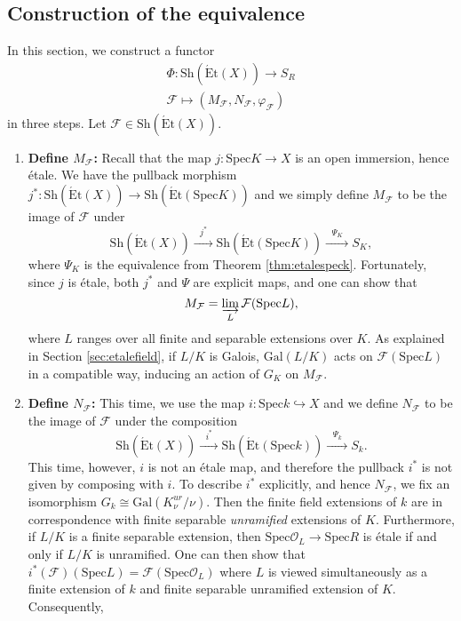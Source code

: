 \documentclass{article}
\newcommand{\Spec}{\mathrm{Spec}}
\newcommand{\Gal}{\mathrm{Gal}}
\newcommand{\Et}{\acute{\mathrm{E}}\mathrm{t}}
\newcommand{\Sh}{\mathrm{Sh}}
\theoremstyle{plain}
\theoremstyle{definition}
\begin{document}
    \subsection{Construction of the equivalence}
    In this section, we construct a functor 
    \begin{align*}
        \Phi:\Sh(\Et(X))\longrightarrow S_R\\
        \mathcal{F}\longmapsto (M_\mathcal{F},N_\mathcal{F},\varphi_\mathcal{F})
    \end{align*}
    in three steps. Let $\mathcal{F}\in\Sh(\Et(X))$.
    \begin{enumerate}[(1)]
        \item \textbf{Define $M_\mathcal{F}$:} Recall that the map $j:\Spec K\rightarrow X$ is an open immersion, hence \'{e}tale. We have the pullback morphism $j^*:\Sh(\Et(X))\to\Sh(\Et(\Spec K))$ and we simply define $M_\mathcal{F}$ to be the image of $\mathcal{F}$ under 
        $$\Sh(\Et(X))\xrightarrow{\text{  $j^*$  }}\Sh(\Et(\Spec K))\xrightarrow{\text{  $\Psi_K$  }} S_K,$$
        where $\Psi_K$ is the equivalence from Theorem \ref{thm:etalespeck}. Fortunately, since $j$ is \'{e}tale, both $j^*$ and $\Psi$ are explicit maps, and one can show that 
        $$M_\mathcal{F}=\varinjlim_{L}\mathcal{F}(\Spec L),$$
        where $L$ ranges over all finite and separable extensions over $K$. As explained in Section \ref{sec:etalefield}, if $L/K$ is Galois, $\Gal(L/K)$ acts on $\mathcal{F}(\Spec L)$ in a compatible way, inducing an action of $G_K$ on $M_\mathcal{F}$.
        \item \textbf{Define $N_\mathcal{F}$:} This time, we use the map $i:\Spec k\hookrightarrow X$ and we define $N_\mathcal{F}$ to be the image of $\mathcal{F}$ under the composition
        $$\Sh(\Et(X))\xrightarrow{\text{  $i^*$  }}\Sh(\Et(\Spec k))\xrightarrow{\text{  $\Psi_k$  }} S_k.$$
        This time, however, $i$ is not an \'{e}tale map, and therefore the pullback $i^*$ is not given by composing with $i$. To describe $i^*$ explicitly, and hence $N_\mathcal{F}$, we fix an isomorphism $G_k\cong\Gal(K^{ur}_\nu/\nu)$. Then the finite field extensions of $k$ are in correspondence with finite separable \textit{unramified} extensions of $K$. Furthermore, if $L/K$ is a finite separable extension, then $\Spec\mathcal{O}_L\to\Spec R$ is \'{e}tale if and only if $L/K$ is unramified. One can then show that $i^*(\mathcal{F})(\Spec L)=\mathcal{F}(\Spec\mathcal{O}_L)$ where $L$ is viewed simultaneously as a finite extension of $k$ and finite separable unramified extension of $K$. Consequently, 

\end{enumerate}
\end{document}
